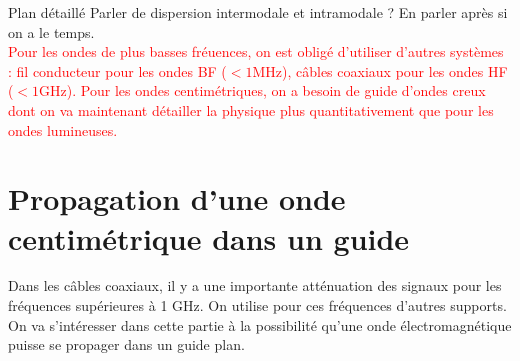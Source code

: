 \begin{reportBlock}{Plan détaillé}
  Parler de dispersion intermodale et intramodale ? En parler après si on a le temps.\\

  \textcolor{red}{Pour les ondes de plus basses fréuences, on est obligé d'utiliser d'autres systèmes : fil conducteur pour les ondes BF ($<1$MHz), câbles coaxiaux pour les ondes HF ($<1$GHz). Pour les ondes centimétriques, on a besoin de guide d'ondes creux dont on va maintenant détailler la physique plus quantitativement que pour les ondes lumineuses.}
  
  \section{Propagation d'une onde centimétrique dans un guide}
   Dans les câbles coaxiaux, il y a une importante atténuation des signaux pour les fréquences supérieures à 1 GHz. On utilise pour ces fréquences d'autres supports. On va s'intéresser dans cette partie à la possibilité qu'une onde électromagnétique puisse se propager dans un guide plan. 

\end{reportBlock}

